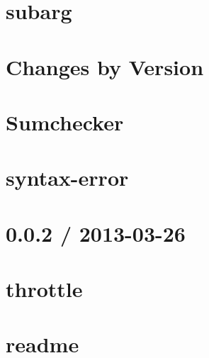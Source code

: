 \documentclass[twoside]{book}
\newcommand{\+}{\discretionary{\mbox{\scriptsize$\hookleftarrow$}}{}{}}
\begin{document}
\chapter{subarg}
\label{md_dsmacc_examples_DRmerge_node_modules_subarg_readme}

\chapter{Changes by Version}
\label{md_dsmacc_examples_DRmerge_node_modules_sumchecker_NEWS}

\chapter{Sumchecker}
\label{md_dsmacc_examples_DRmerge_node_modules_sumchecker_README}

\chapter{syntax-\/error}
\label{md_dsmacc_examples_DRmerge_node_modules_syntax-error_readme}

\chapter{0.0.2 / 2013-\/03-\/26}
\label{md_dsmacc_examples_DRmerge_node_modules_throttleit_History}

\chapter{throttle}
\label{md_dsmacc_examples_DRmerge_node_modules_throttleit_Readme}

\chapter{readme}
\label{md_dsmacc_examples_DRmerge_node_modules_through_readme}

\end{document}
